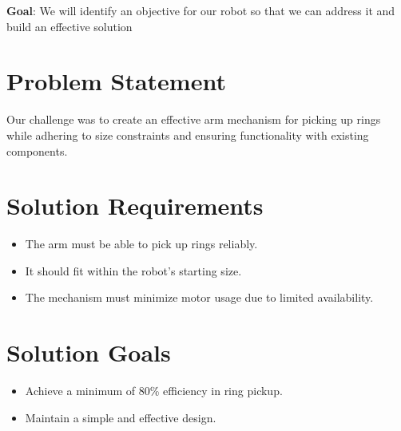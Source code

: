 \label{chap:ArmV1.1}
\textbf{Goal}: We will identify an objective for our robot so that we can address it and build an effective solution
\section*{Problem Statement}
Our challenge was to create an effective arm mechanism for picking up rings while adhering to size constraints and ensuring functionality with existing components.

\section*{Solution Requirements}
\begin{itemize}
    \item The arm must be able to pick up rings reliably.
    \item It should fit within the robot's starting size.
    \item The mechanism must minimize motor usage due to limited availability.
\end{itemize}

\section*{Solution Goals}
\begin{itemize}
    \item Achieve a minimum of 80\% efficiency in ring pickup.
    \item Maintain a simple and effective design.
\end{itemize}



